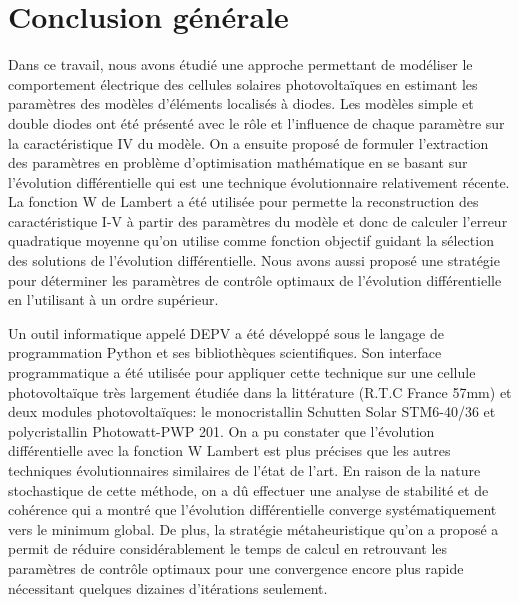 \chapter*{Conclusion générale}
\label{sec:conc}
Dans ce travail, nous avons étudié une approche permettant de modéliser le comportement électrique des cellules solaires photovoltaïques en estimant les paramètres des modèles d'éléments localisés à diodes. Les modèles simple et double diodes ont été présenté avec le rôle et l'influence de chaque paramètre sur la caractéristique IV du modèle. On a ensuite proposé de formuler l'extraction des paramètres en problème d'optimisation mathématique en se basant sur l'évolution différentielle qui est une technique évolutionnaire relativement récente. La fonction W de Lambert a été utilisée pour permette la reconstruction des caractéristique I-V à partir des paramètres du modèle et donc de calculer l'erreur quadratique moyenne qu'on utilise comme fonction objectif guidant la sélection des solutions de l'évolution différentielle. Nous avons aussi proposé une stratégie pour déterminer les paramètres de contrôle optimaux de l'évolution différentielle en l'utilisant à un ordre supérieur.

Un outil informatique appelé DEPV a été développé sous le langage de programmation Python et ses bibliothèques scientifiques. Son interface programmatique a été utilisée pour appliquer cette technique sur une cellule photovoltaïque très largement étudiée dans la littérature (R.T.C France 57mm) et deux modules photovoltaïques: le monocristallin Schutten Solar STM6-40/36 et polycristallin Photowatt-PWP 201. On a pu constater que l'évolution différentielle avec la fonction W Lambert est plus précises que les autres techniques évolutionnaires similaires de l'état de l'art. En raison de la nature stochastique de cette méthode, on a dû effectuer une analyse de stabilité et de cohérence qui a montré que l'évolution différentielle converge systématiquement vers le minimum global. De plus, la stratégie métaheuristique qu'on a proposé a permit de réduire considérablement le temps de calcul en retrouvant les paramètres de contrôle optimaux pour une convergence encore plus rapide nécessitant quelques dizaines d'itérations seulement.


